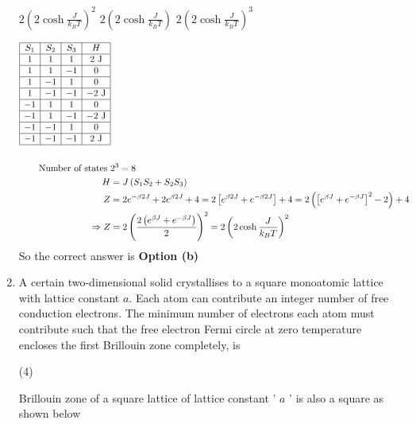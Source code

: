 \begin{enumerate}
\begin{tasks}
	\task[\textbf{b.}]$2\left(2 \cosh \frac{J}{k_{B} T}\right)^{2}$
	\task[\textbf{c.}]$2\left(2 \cosh \frac{J}{k_{B} T}\right)$
	\task[\textbf{d.}] $2\left(2 \cosh \frac{J}{k_{B} T}\right)^{3}$
\end{tasks}
\begin{answer}
	\begin{align*}
	\begin{array}{|c|c|c|c|}
	\hline S_{1} & S_{2} & S_{3} & H \\
	\hline 1 & 1 & 1 & 2 \mathrm{~J} \\
	\hline 1 & 1 & -1 & 0 \\
	\hline 1 & -1 & 1 & 0 \\
	\hline 1 & -1 & -1 & -2 \mathrm{~J} \\
	\hline-1 & 1 & 1 & 0 \\
	\hline-1 & 1 & -1 & -2 \mathrm{~J} \\
	\hline-1 & -1 & 1 & 0 \\
	\hline-1 & -1 & -1 & 2 \mathrm{~J} \\
	\hline
	\end{array}\\\\
	\text{Number of states }&2^{3}=8\\
	H&=J\left(S_{1} S_{2}+S_{2} S_{3}\right) \\
	Z&=2 e^{-\beta 2 J}+2 e^{\beta 2 J}+4=2\left[e^{\beta 2 J}+e^{-\beta 2 J}\right]+4=2\left(\left[e^{\beta J}+e^{-\beta J}\right]^{2}-2\right)+4 \\
	\Rightarrow Z&=2\left(\frac{2\left(e^{\beta J}+e^{-\beta J}\right)}{2}\right)^{2}=2\left(2 \cosh \frac{J}{k_{B} T}\right)^{2}
	\end{align*}
	So the correct answer is \textbf{Option (b)}
\end{answer}
\item  A certain two-dimensional solid crystallises to a square monoatomic lattice with lattice constant $a$. Each atom can contribute an integer number of free conduction electrons. The minimum number of electrons each atom must contribute such that the free electron Fermi circle at zero temperature encloses the first Brillouin zone completely, is
 \begin{tasks}(4)
\end{tasks}
\begin{answer}
	Brillouin zone of a square lattice of lattice constant ' $a$ ' is also a square as shown below
	\begin{figure}[H]

\end{figure}
\end{answer}
\end{enumerate}
